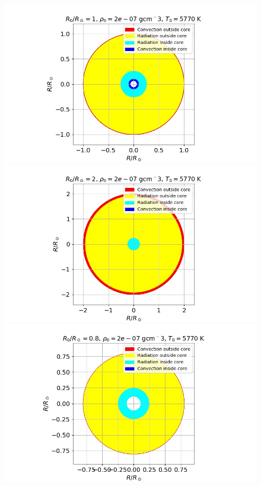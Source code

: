 \documentclass{emulateapj}
\begin{document}
	\begin{figure}
		\centering
		\includegraphics[width=1\columnwidth]{CrossSec1.jpg}
		\includegraphics[width=1\columnwidth]{CrossSec2.jpg}
		\includegraphics[width=1\columnwidth]{CrossSec3.jpg}

\end{figure}
\end{document}
